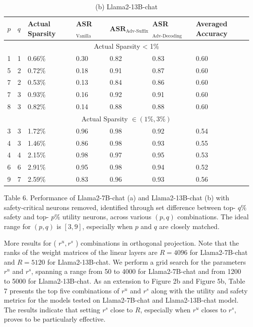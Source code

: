 \documentclass[10pt]{article}
\begin{document}
\begin{table}[h]
\begin{center}
\begin{tabular}{|l|l|l|l|l|l|l|}
\hline
$p$ & $q$ & Actual Sparsity & ASR $_{\text {Vanilla }}$ & $\mathbf{A S R}_{\text {Adv-Suffix }}$ & ASR $_{\text {Adv-Decoding }}$ & Averaged Accuracy \\
\hline
\multicolumn{7}{|c|}{Actual Sparsity < 1\%} \\
\hline
1 & 1 & 0.66\% & 0.30 & 0.82 & 0.83 & 0.60 \\
\hline
5 & 2 & 0.72\% & 0.18 & 0.91 & 0.87 & 0.60 \\
\hline
7 & 2 & 0.53\% & 0.13 & 0.84 & 0.86 & 0.60 \\
\hline
7 & 3 & 0.93\% & 0.16 & 0.92 & 0.91 & 0.60 \\
\hline
8 & 3 & 0.82\% & 0.14 & 0.88 & 0.88 & 0.60 \\
\hline
\multicolumn{7}{|c|}{Actual Sparsity $\in(1 \%, 3 \%)$} \\
\hline
3 & 3 & 1.72\% & 0.96 & 0.98 & 0.92 & 0.54 \\
\hline
4 & 3 & 1.46\% & 0.86 & 0.98 & 0.93 & 0.55 \\
\hline
4 & 4 & 2.15\% & 0.98 & 0.97 & 0.95 & 0.53 \\
\hline
6 & 6 & 2.91\% & 0.95 & 0.98 & 0.94 & 0.52 \\
\hline
9 & 7 & 2.59\% & 0.83 & 0.96 & 0.93 & 0.56 \\
\hline
\end{tabular}
\captionsetup{labelformat=empty}
\caption{(b) Llama2-13B-chat}
\end{center}
\end{table}

Table 6. Performance of Llama2-7B-chat (a) and Llama2-13B-chat (b) with safety-critical neurons removed, identified through set difference between top- $q \%$ safety and top- $p \%$ utility neurons, across various $(p, q)$ combinations. The ideal range for $(p, q)$ is $[3,9]$, especially when $p$ and $q$ are closely matched.

More results for ( $r^{u}, r^{s}$ ) combinations in orthogonal projection. Note that the ranks of the weight matrices of the linear layers are $R=4096$ for Llama2-7B-chat and $R=5120$ for Llama2-13B-chat. We perform a grid search for the parameters $r^{u}$ and $r^{s}$, spanning a range from 50 to 4000 for Llama2-7B-chat and from 1200 to 5000 for Llama2-13B-chat. As an extension to Figure 2b and Figure 5b, Table 7 presents the top five combinations of $r^{u}$ and $r^{s}$ along with the utility and safety metrics for the models tested on Llama2-7B-chat and Llama2-13B-chat model. The results indicate that setting $r^{s}$ close to $R$, especially when $r^{u}$ closes to $r^{s}$, proves to be particularly effective.
\end{document}
